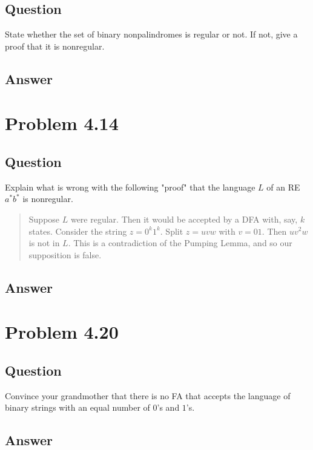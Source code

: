 \documentclass[12pt, a4paper]{article}
\begin{document}
\subsection{Question}
State whether the set of binary nonpalindromes is regular or not. If not, give a proof that it is nonregular.
\subsection{Answer}

\section{Problem 4.14}
\subsection{Question}
Explain what is wrong with the following "proof" that the language $L$ of an RE $a^{*}b^{*}$ is nonregular.

\begin{quotation}
Suppose $L$ were regular. Then it would be accepted by a DFA with, say, $k$ states. Consider the string $z=0^{k}1^{k}$. Split $z=uvw$ with $v=01$. Then $uv^{2}w$ is not in $L$. This is a contradiction of the Pumping Lemma, and so our supposition is false.
\end{quotation}
\subsection{Answer}

\section{Problem 4.20}
\subsection{Question}
Convince your grandmother that there is no FA that accepts the language of binary strings with an equal number of $0$'s and $1$'s.
\subsection{Answer}
\end{document}

